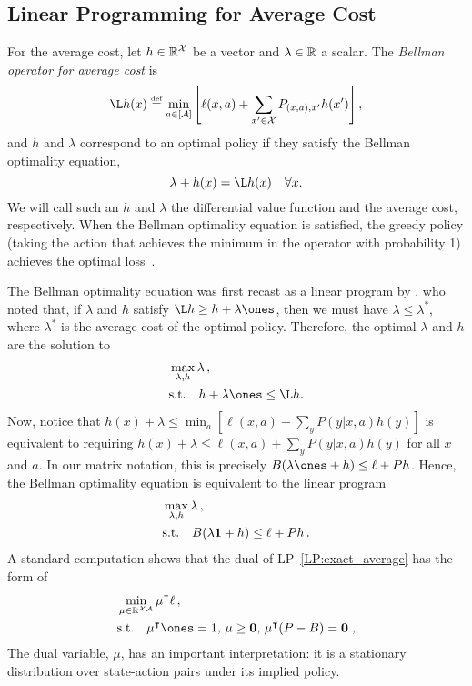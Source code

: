 \documentclass[11pt]{article}
\newcommand{\df}{\stackrel{\mbox{\rm\tiny def}}{=}}
\begin{document}
\subsection{Linear Programming for Average Cost}
For the average cost, let $h\in\mathbb R^{\cal X}$ be a vector and $\lambda\in\mathbb R$ a scalar. The \emph{Bellman operator for average cost} is
\begin{equation*}
\L h(x)\df
\min_{a \in [\cA]} \left[ \ell(x,a) + \sum_{x'\in\cX} P_{(x,a),x'} h(x') \right],
\end{equation*}
and $h$ and $\lambda$ correspond to an optimal policy if they satisfy the Bellman optimality equation,
\begin{equation*}
\lambda + h(x) = \L h(x)\quad\forall x.
\end{equation*}
We will call such an $h$ and $\lambda$ the differential value function and the average cost, respectively. When the Bellman optimality equation is satisfied, the greedy policy (taking the action that achieves the minimum in the operator with probability 1) achieves the optimal loss~\citep{Puterman:MDP}. %

The Bellman optimality equation was first recast as a linear program by \cite{Manne-1960}, who noted that, if
$\lambda$ and $h$ satisfy $\L h\geq h+\lambda\ones$, then we must have $\lambda\leq\lambda^*$, where $\lambda^*$ is the average cost of the optimal policy. Therefore, the optimal $\lambda$ and $h$ are the solution to
\begin{align*}
&\max_{\lambda, h} \lambda\,, \\
\notag
&\mbox{s.t.}\quad h+\lambda\ones\leq \L h.
\end{align*}
Now, notice that $h(x)+\lambda \leq \min_{a}\left[\ell(x,a)+\sum_{y}P(y|x,a)h(y)\right]$ is equivalent to requiring
$h(x)+\lambda\leq\ell(x,a)+\sum_{y}P(y|x,a)h(y)$ for all $x$ and $a$. In our matrix notation, this is precisely $B(\lambda\ones+h)\leq\ell+P h$. Hence, the Bellman optimality equation is equivalent to the linear program
\begin{align}
\label{LP:exact_average}
&\max_{\lambda, h} \lambda\,, \\
\notag
&\mbox{s.t.}\quad B(\lambda \mathbf 1 + h) \le \ell + P h \,.
\end{align}
A standard computation shows that the dual of LP~\eqref{LP:exact_average} has the form of
\begin{align}
\label{LP:exact_average_dual}
&\min_{\mu\in \Reals^{\cX \cA}} \mu^\top \ell\,, \\
\notag
&\mbox{s.t.}\quad \mu^\top \ones = 1,\, \mu \geq \mathbf 0,\, \mu^\top (P - B) = \mathbf 0 \; ,
\end{align}
The dual variable, $\mu$, has an important interpretation: it is a stationary distribution over state-action pairs under its implied policy.
\end{document}
